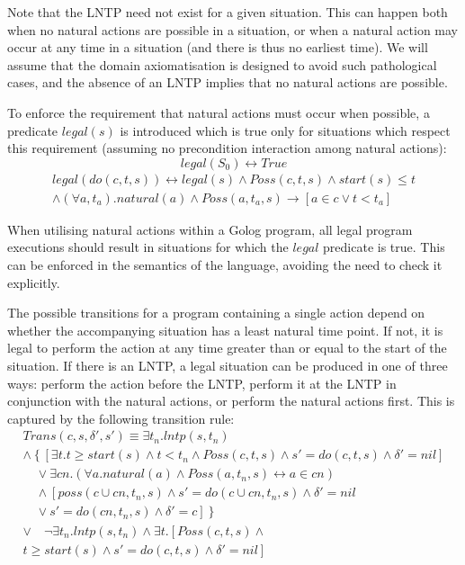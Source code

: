 \documentclass[letterpaper]{article}
\begin{document}
Note that the LNTP need not exist for a given situation. This can
happen both when no natural actions are possible in a situation, or
when a natural action may occur at any time in a situation (and there
is thus no earliest time). We will assume that the domain axiomatisation
is designed to avoid such pathological cases, and the absence of an
LNTP implies that no natural actions are possible.

To enforce the requirement that natural actions must occur when possible,
a predicate $legal(s)$ is introduced which is true only for situations
which respect this requirement (assuming no precondition interaction
among natural actions):
\begin{equation}
legal(S_{0}) \leftrightarrow True
\end{equation}
\begin{multline}
legal(do(c,t,s)) \leftrightarrow legal(s)\wedge Poss(c,t,s)\wedge start(s)\leq t\\
\wedge (\forall a,t_{a}).natural(a)\wedge Poss(a,t_{a},s)\rightarrow\left[a\in c\vee t<t_{a}\right]
\end{multline}


When utilising natural actions within a Golog program, all legal program
executions should result in situations for which the $legal$ predicate
is true. This can be enforced in the semantics of the language, avoiding
the need to check it explicitly.

The possible transitions for a program containing a single action
depend on whether the accompanying situation has a least natural time
point. If not, it is legal to perform the action at any time greater
than or equal to the start of the situation. If there is an LNTP,
a legal situation can be produced in one of three ways: perform the
action before the LNTP, perform it at the LNTP in conjunction with
the natural actions, or perform the natural actions first. This is
captured by the following transition rule:
\begin{multline}
Trans(c,s,\delta',s')\equiv \exists t_{n}. lntp(s,t_{n}) \\
  \wedge \left\{ \left[\exists t.t\geq start(s)\wedge t<t_{n}\wedge Poss(c,t,s)\wedge s'=do(c,t,s)\wedge\delta'=nil\right]\right.\\
   \quad\vee\exists cn.\left(\forall a.natural(a)\wedge Poss(a,t_{n},s)\leftrightarrow a\in cn\right)\\
  \quad\wedge\left[poss(c\cup cn,t_{n},s)\wedge s'=do(c\cup cn,t_{n},s)\wedge\delta'=nil\right.\\
  \quad\vee\left.\left.s'=do(cn,t_{n},s)\wedge\delta'=c\right]\right\}\\
  \vee\quad\neg\exists t_{n}.lntp(s,t_{n})\wedge\exists t.\left[Poss(c,t,s)\wedge\right.\\
  \left.t\geq start(s)\wedge s'=do(c,t,s)\wedge\delta'=nil\right]
\end{multline}
\end{document}
